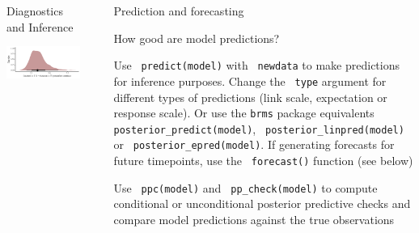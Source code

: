 \documentclass[final,9pt,fleqn]{beamer}\usepackage[]{graphicx}\usepackage[]{xcolor}
\makeatletter
\def\maxwidth{ %
  \ifdim\Gin@nat@width>\linewidth
    \linewidth
  \else
    \Gin@nat@width
  \fi
}
\newenvironment{knitrout}{}{} %
\makeatother
\begin{document}
\begin{frame}[fragile]
\begin{columns}
\begin{column}{0.3\paperwidth}
\begin{block}{{\fontsize{21}{21} \selectfont \color{BrickRed} Diagnostics and Inference}}
\begin{knitrout}
{\centering \includegraphics[width=\maxwidth]{figure/unnamed-chunk-6-1} 

}


\end{knitrout}

\end{block}
\end{column}


\begin{column}{.03\paperwidth}
\end{column}


\begin{column}{0.3\paperwidth}
\vspace{0.37in}
\noindent\makebox[\linewidth]{\rule{0.3\paperwidth}{0.2pt}}
\begin{block}{{\fontsize{21}{21} \selectfont \color{BrickRed} Prediction and forecasting}}

\smallskip
{{\fontsize{11}{11} \selectfont \color{mygray} How good are model predictions?}}

\medskip
Use \texttt{\color{Orchid} predict(model)} with \texttt{\color{Orchid} newdata} to make predictions for inference purposes. Change the \texttt{\color{Orchid} type} argument for different types of predictions (link scale, expectation or response scale). Or use the \texttt{brms} package equivalents \texttt{\color{Orchid} posterior\_predict(model)}, \texttt{\color{Orchid} posterior\_linpred(model)} or \texttt{\color{Orchid} posterior\_epred(model)}. If generating forecasts for future timepoints, use the \texttt{\color{Orchid} forecast()} function (see below)

\medskip
Use \texttt{\color{Orchid} ppc(model)} and \texttt{\color{Orchid} pp\_check(model)} to compute conditional or unconditional posterior predictive checks and compare model predictions against the true observations


\end{block}
\end{column}
\end{columns}
\end{frame}
\end{document}
